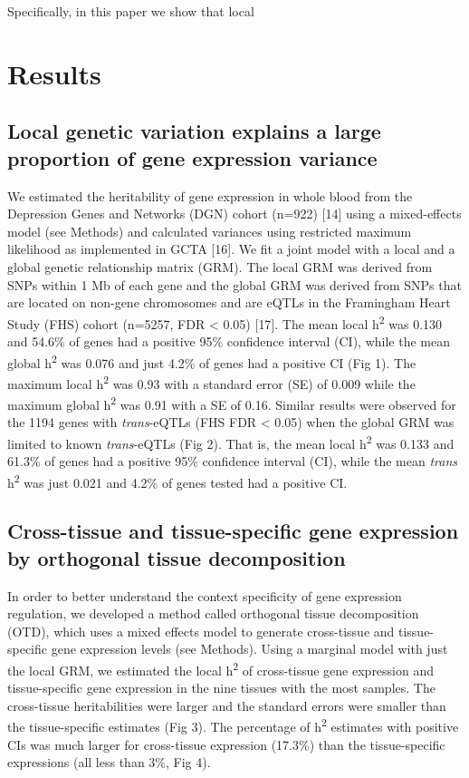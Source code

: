 \documentclass[]{article}
\begin{document}
Specifically, in this paper we show that local

\section{Results}\label{results}

\subsection{Local genetic variation explains a large proportion of gene
expression
variance}\label{local-genetic-variation-explains-a-large-proportion-of-gene-expression-variance}

We estimated the heritability of gene expression in whole blood from the
Depression Genes and Networks (DGN) cohort (n=922) {[}14{]} using a
mixed-effects model (see Methods) and calculated variances using
restricted maximum likelihood as implemented in GCTA {[}16{]}. We fit a
joint model with a local and a global genetic relationship matrix (GRM).
The local GRM was derived from SNPs within 1 Mb of each gene and the
global GRM was derived from SNPs that are located on non-gene
chromosomes and are eQTLs in the Framingham Heart Study (FHS) cohort
(n=5257, FDR \textless{} 0.05) {[}17{]}. The mean local
h\textsuperscript{2} was 0.130 and 54.6\% of genes had a positive 95\%
confidence interval (CI), while the mean global h\textsuperscript{2} was
0.076 and just 4.2\% of genes had a positive CI (Fig 1). The maximum
local h\textsuperscript{2} was 0.93 with a standard error (SE) of 0.009
while the maximum global h\textsuperscript{2} was 0.91 with a SE of
0.16. Similar results were observed for the 1194 genes with
\emph{trans}-eQTLs (FHS FDR \textless{} 0.05) when the global GRM was
limited to known \emph{trans}-eQTLs (Fig 2). That is, the mean local
h\textsuperscript{2} was 0.133 and 61.3\% of genes had a positive 95\%
confidence interval (CI), while the mean \emph{trans}
h\textsuperscript{2} was just 0.021 and 4.2\% of genes tested had a
positive CI.

\subsection{Cross-tissue and tissue-specific gene expression by
orthogonal tissue
decomposition}\label{cross-tissue-and-tissue-specific-gene-expression-by-orthogonal-tissue-decomposition}

In order to better understand the context specificity of gene expression
regulation, we developed a method called orthogonal tissue decomposition
(OTD), which uses a mixed effects model to generate cross-tissue and
tissue-specific gene expression levels (see Methods). Using a marginal
model with just the local GRM, we estimated the local
h\textsuperscript{2} of cross-tissue gene expression and tissue-specific
gene expression in the nine tissues with the most samples. The
cross-tissue heritabilities were larger and the standard errors were
smaller than the tissue-specific estimates (Fig 3). The percentage of
h\textsuperscript{2} estimates with positive CIs was much larger for
cross-tissue expression (17.3\%) than the tissue-specific expressions
(all less than 3\%, Fig 4).
\end{document}

